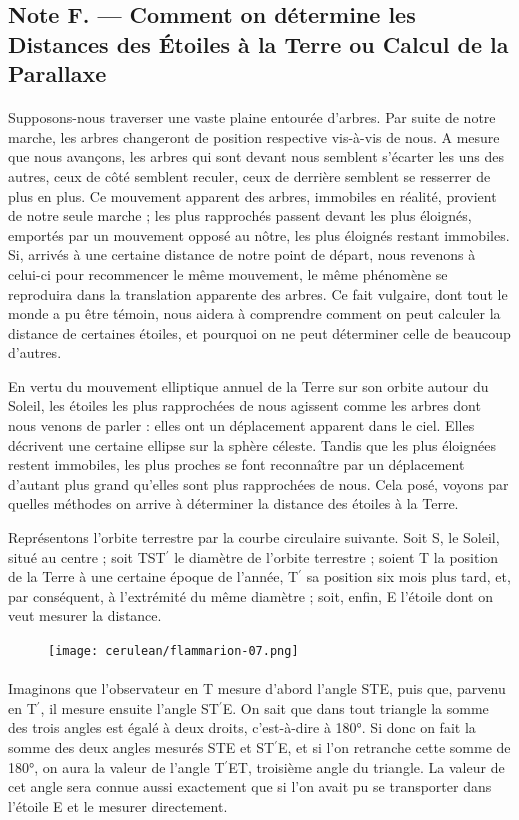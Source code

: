 \documentclass[a4paper, 11pt, oneside, landscape]{article}
\begin{document}
\subsection{Note F. --- Comment on détermine les Distances des Étoiles à la Terre ou Calcul de la Parallaxe}
\paragraph{}
Supposons-nous traverser une vaste plaine entourée d'arbres. Par suite de notre marche, les arbres changeront de position respective vis-à-vis de nous. A mesure que nous avançons, les arbres qui sont devant nous semblent s'écarter les uns des autres, ceux de côté semblent reculer, ceux de derrière semblent se resserrer de plus en plus. Ce mouvement apparent des arbres, immobiles en réalité, provient de notre seule marche ; les plus rapprochés passent devant les plus éloignés, emportés par un mouvement opposé au nôtre, les plus éloignés restant immobiles. Si, arrivés à une certaine distance de notre point de départ, nous revenons à celui-ci pour recommencer le même mouvement, le même phénomène se reproduira dans la translation apparente des arbres. Ce fait vulgaire, dont tout le monde a pu être témoin, nous aidera à comprendre comment on peut calculer la distance de certaines étoiles, et pourquoi on ne peut déterminer celle de beaucoup d'autres.

En vertu du mouvement elliptique annuel de la Terre sur son orbite autour du Soleil, les étoiles les plus rapprochées de nous agissent comme les arbres dont nous venons de parler : elles ont un déplacement apparent dans le ciel. Elles décrivent une certaine ellipse sur la sphère céleste. Tandis que les plus éloignées restent immobiles, les plus proches se font reconnaître par un déplacement d'autant plus grand qu'elles sont plus rapprochées de nous. Cela posé, voyons par quelles méthodes on arrive à déterminer la distance des étoiles à la Terre.

Représentons l'orbite terrestre par la courbe circulaire suivante. Soit S, le Soleil, situé au centre ; soit TST$^{\prime}$ le diamètre de l'orbite terrestre ; soient T la position de la Terre à une certaine époque de l'année, T$^{\prime}$ sa position six mois plus tard, et, par conséquent, à l'extrémité du même diamètre ; soit, enfin, E l'étoile dont on veut mesurer la distance.
\begin{figure}[H]
\centering
\texttt{[image: cerulean/flammarion-07.png]}
\end{figure}
\paragraph{}
Imaginons que l'observateur en T mesure d'abord l'angle STE, puis que, parvenu en T$^{\prime}$, il mesure ensuite l'angle ST$^{\prime}$E. On sait que dans tout triangle la somme des trois angles est égalé à deux droits, c'est-à-dire à 180°. Si donc on fait la somme des deux angles mesurés STE et ST$^{\prime}$E, et si l'on retranche cette somme de 180°, on aura la valeur de l'angle T$^{\prime}$ET, troisième angle du triangle. La valeur de cet angle sera connue aussi exactement que si l'on avait pu se transporter dans l'étoile E et le mesurer directement.
\end{document}
